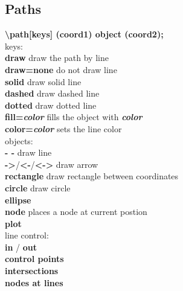 \documentclass[10pt]{article}
\newcommand{\tikzcmd}[1]{\textbf{#1}}
\newcommand{\tikzparam}[1]{\textbf{\emph{#1}}}
\begin{document}
\begin{multicols}{2}
        \section{Paths}
        \tikzcmd{\textbackslash path[keys] (coord1) object (coord2);}\\
        keys:\\
        \tikzcmd{draw} draw the path by line\\
        \tikzcmd{draw=none} do not draw line\\
        \tikzcmd{solid} draw solid line\\
        \tikzcmd{dashed} draw dashed line\\
        \tikzcmd{dotted} draw dotted line\\
        \tikzcmd{fill=\tikzparam{color}} fills the object with \tikzparam{color}\\
        \tikzcmd{color=\tikzparam{color}} sets the line color\\
        objects:\\
        \tikzcmd{- -} draw line\\
        \tikzcmd{->}/\tikzcmd{<-}/\tikzcmd{<->} draw arrow\\
        \tikzcmd{rectangle} draw rectangle between coordinates\\
        \tikzcmd{circle} draw circle\\
        \tikzcmd{ellipse}\\
        \tikzcmd{node} places a node at current postion\\
        \tikzcmd{plot}\\
        line control:\\
        \tikzcmd{in} / \tikzcmd{out}\\
        \tikzcmd{control points}\\
        \tikzcmd{intersections}\\
        \tikzcmd{nodes at lines}


\end{multicols}
\end{document}
